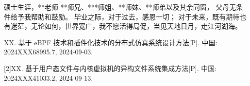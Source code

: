 \documentclass[lang=chs, degree=master, blindreview=true, winfonts=true, academic=false]{yanputhesis}
\begin{document}
\cleardoublepage
\backmatter                                                 %
\begin{acknowledgements}                                    %
   硕士生涯，**老师
   **师兄、***师姐、**师妹、**师弟以及其余同窗，
   父母无条件给予我帮助和鼓励。
   毕业之际，对于过去，感恩一切；
   对于未来，既有期待也有迷茫，无论如何，世界宽广，我不愿活得局促，当见天地日月，走江河湖海。


\end{acknowledgements}                                      %
\begin{accomplishments}                                     %
[1]XX. 基于 eBPF 技术和插件化技术的分布式仿真系统设计方法[P]. 中国: 2024XXX68995.7, 2024-09-03.

[2]XX. 基于用户态文件与内核虚拟机的异构文件系统集成方法[P]. 中国: 2024XXX41033.2, 2024-09-13.



\end{accomplishments}                                       %
\makestatement                                              %
\end{document}
